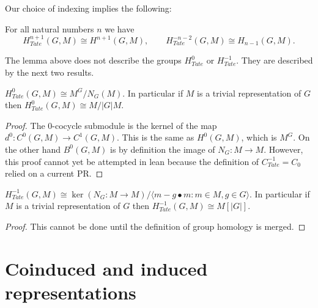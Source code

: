 Our choice of indexing implies the following:

\begin{lemma}	\label{lem:Tate cohomology is cohomology or homology}
	\leanok
	For all natural numbers $n$ we have
	\[
		H^{n+1}_{Tate}(G,M) \cong H^{n+1} (G,M), \qquad
		H^{-n-2}_{Tate}(G,M) \cong H_{n-1} (G,M).
	\]
\end{lemma}

The lemma above does not describe the groups $H^0_{Tate}$ or $H^{-1}_{Tate}$.
They are described by the next two results.

\begin{lemma}	\label{lem:Tate 0}
	\leanok
	$H^0_{Tate}(G,M) \cong M^G / N_G(M)$.
	In particular if $M$ is a trivial representation of $G$ then
	$H^0_{Tate}(G,M) \cong M / |G|M$.
\end{lemma}

\begin{proof}
	The $0$-cocycle submodule is the kernel of the map $d^0 : C^0(G,M) \to C^1(G,M)$.
	This is the same as $H^0(G,M)$, which is $M^G$.
	On the other hand $B^0(G,M)$ is by definition the image of $N_G : M \to M$.
	However, this proof cannot yet be attempted in lean because the definition of
	$C^{-1}_{Tate} = C_0$ relied on a current PR.
\end{proof}

\begin{lemma}	\label{lem:Tate -1}
	\leanok
	$H^{-1}_{Tate}(G,M) \cong \ker (N_G : M \to M ) /
	\langle {m - g \bullet m : m \in M, g \in G}\rangle$.
	In particular if $M$ is a trivial representation of $G$ then
	$H^{-1}_{Tate}(G,M) \cong M[|G|]$.
\end{lemma}

\begin{proof}
	This cannot be done until the definition of group homology is merged.
\end{proof}



\section{Coinduced and induced representations}


